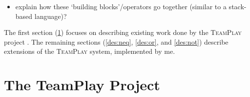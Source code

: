 \begin{itemize}
    \item explain how these `building blocks'/operators go together (similar to
    	  a stack-based language)?
\end{itemize}

The first section (\ref{des:tp-dsl}) focuses on describing existing work done by the \textsc{TeamPlay} project \cite{teamplay:d1.1}. The remaining sections (\ref{des:neq}, \ref{des:or}, and \ref{des:not}) describe extensions of the \textsc{TeamPlay} system, implemented by me.


\section{The TeamPlay Project}\label{des:tp-dsl}
